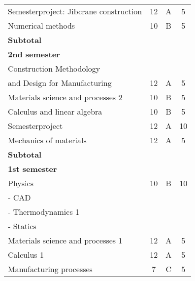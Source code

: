 \documentclass[letterpaper]{twentysecondcv} %
\begin{document}
\begin{tabular}{lccc}
		Semesterproject: Jibcrane construction & 12           & A                     & 5          \\
		Numerical methods     & 10            & B                     & 5         \\ 
		\textbf{Subtotal}                          &               &                       & \fbox{\textbf{30}} \vspace{2mm}\\ \hline 
		\textbf{2nd semester}		& 						    & 						&           \\ \hline \hline
		Construction Methodology \\
		and Design for Manufacturing & 12  & A                 & 5     \\
		Materials science and processes 2       & 10            & B                     & 5        \\
		Calculus and linear algebra             & 10            & B                     & 5         \\
		Semesterproject                         & 12            & A                     & 10        \\
		Mechanics of materials                  & 12            & A                     & 5         \\
		\textbf{Subtotal}                       &               &                       & \fbox{\textbf{30}} \vspace{2mm}\\ \hline
		\textbf{1st semester}		& 						    & 						&           \\ \hline \hline
		Physics    & 10        & B                     & 10        \\
		    \hphantom{m} - CAD              \\
		    \hphantom{m} - Thermodynamics 1 \\
		    \hphantom{m} - Statics          \\
		Materials science and processes  1       & 12            & A                     & 5         \\
		Calculus 1                              & 12             & A                    & 5         \\
		Manufacturing processes                 & 7             & C                     & 5         \\

\end{tabular}
\end{document}
